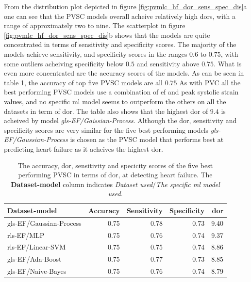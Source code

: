 From the distribution plot depicted in figure \ref{fig:pvmlc_hf_dor_sens_spec_dis}a one can see that the PVSC models overall acheive relatively high \acrshort{dor}s, 
with a range of approximately two to nine.
The scatterplot in figure \ref{fig:pvmlc_hf_dor_sens_spec_dis}b shows that the models are quite concentrated in terms of sensitivity and specificity scores. 
The majority of the models achieve sensitivity, and specificity scores in the ranges $0.6$ to $0.75$, with some outliers acheiving specificity below $0.5$ and sensitivity above $0.75$.
What is even more concentrated are the accuracy scores of the models. 
As can be seen in table \ref{tab:pvmlc_hf_dor_sens_spec_dis}, the accuracy of top five PVSC models are all $0.75$
As with PVC all the best performing PVSC models use a combination of \acrshort{ef} and peak systolic strain values, 
and no specific \acrshort{ml} model seems to outperform the others on all the datasets in term of \acrshort{dor}.
The table also shows that the highest \acrshort{dor} of $9.4$ is acheived by model \textit{gls-EF/Gaissian-Process}. 
Although the \acrshort{dor}, sensitivity and specificity scores are very similar for the five best performing models \textit{gls-EF/Gaussian-Process} is chosen as the PVSC model that performs best at predicting heart failure as it acheives the highest \acrshort{dor}.


\begin{table}
    \centering
    \begin{tabular}{lrrrr}
        \toprule
        Dataset-model           &  Accuracy &  Sensitivity &  Specificity &  \acrshort{dor} \\
        \midrule
        gls-EF/Gaussian-Process &      0.75 &         0.78 &         0.73 & 9.40 \\
        rls-EF/MLP              &      0.75 &         0.76 &         0.74 & 9.37 \\
        rls-EF/Linear-SVM       &      0.75 &         0.75 &         0.74 & 8.86 \\
        gls-EF/Ada-Boost        &      0.75 &         0.77 &         0.73 & 8.85 \\
        gls-EF/Naive-Bayes      &      0.75 &         0.76 &         0.74 & 8.79 \\
        \bottomrule
    \end{tabular}
    \caption{The accuracy, \acrshort{dor}, sensitivity and specicity scores of the five best performing PVSC in terms of \acrshort{dor}, at detecting heart failure. The \textbf{Dataset-model} column indicates \textit{Dataset used}$/$\textit{The specific \acrshort{ml} model used}.}
    \label{tab:pvmlc_hf_dor_sens_spec_dis}
\end{table}

